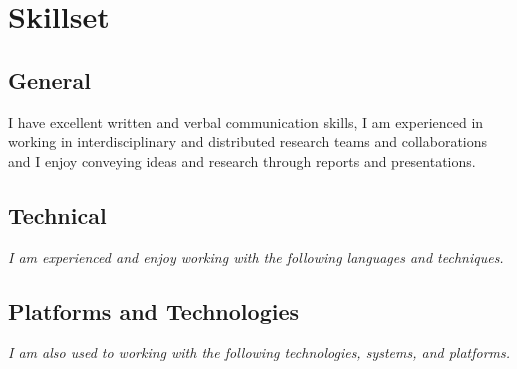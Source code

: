 \documentclass[11pt,a4paper,sans]{moderncv} %
\begin{document}
			

\section{Skillset}
	\subsection{General}
    \hspace{2.5cm}\parbox[b][3em][t]{0.8\textwidth}{I have excellent written and verbal communication skills, I am experienced in working in interdisciplinary and distributed research teams and collaborations and I enjoy conveying ideas and research through reports and presentations.}

	\subsection{Technical}
		\hspace{2.5cm}\textit{I am experienced and enjoy working with the following languages and 					techniques.}\\

	\subsection{Platforms and Technologies}
		\hspace{2.5cm}\textit{I am also used to working with the following technologies, systems, and 				platforms.}\\
\end{document}
